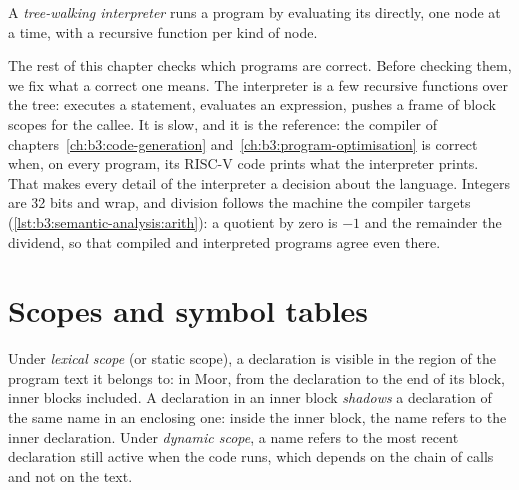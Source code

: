 \begin{definition}\label{def:b3:semantic-analysis:interpreter}
A \emph{tree-walking interpreter} runs a program by evaluating its  directly, one node at a time, with a recursive function per kind of node.
\end{definition}

The rest of this chapter checks which programs are correct. Before checking them, we fix what a correct one means. The interpreter  is a few recursive functions over the tree:  executes a statement,  evaluates an expression,  pushes a frame of block scopes for the callee. It is slow, and it is the reference: the compiler of chapters~\ref{ch:b3:code-generation} and~\ref{ch:b3:program-optimisation} is correct when, on every program, its RISC-V code prints what the interpreter prints. That makes every detail of the interpreter a decision about the language. Integers are 32 bits and wrap, and division follows the machine the compiler targets (\cref{lst:b3:semantic-analysis:arith}): a quotient by zero is $-1$ and the remainder the dividend, so that compiled and interpreted programs agree even there.

\label{lst:b3:semantic-analysis:arith}

\label{out:b3:semantic-analysis:interp}

\section{Scopes and symbol tables}\label{sec:b3:semantic-analysis:scopes}

\begin{definition}\label{def:b3:semantic-analysis:scope}
Under \emph{lexical scope} (or static scope), a declaration is visible in the region of the program text it belongs to: in Moor, from the declaration to the end of its block, inner blocks included. A declaration in an inner block \emph{shadows} a declaration of the same name in an enclosing one: inside the inner block, the name refers to the inner declaration. Under \emph{dynamic scope}, a name refers to the most recent declaration still active when the code runs, which depends on the chain of calls and not on the text.
\end{definition}

